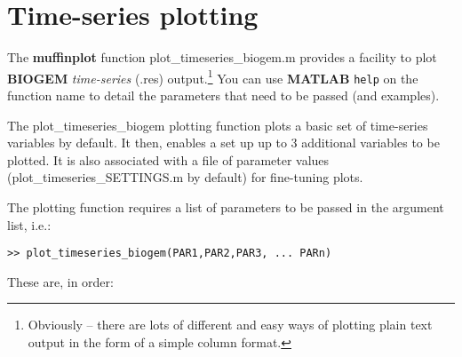 \documentclass[11pt,fleqn]{book} %
\begin{document}

\section{Time-series plotting}

The \textbf{muffinplot} function \textsf{\footnotesize plot\_timeseries\_biogem.m} provides a facility to plot \textbf{BIOGEM} \textit{time-series} (\textsf{\small .res}) output.\footnote{Obviously -- there are lots of different and easy ways of plotting plain text output in the form of a simple column format.} You can use \textbf{MATLAB} \texttt{help} on the function name to detail the parameters that need to be passed (and examples).

The \textsf{\footnotesize plot\_timeseries\_biogem} plotting function plots a basic set of time-series variables by default. It then, enables a set up up to 3 additional variables to be plotted. It is also associated with a file of parameter values (\textsf{\footnotesize plot\_timeseries\_SETTINGS.m} by default) for fine-tuning plots.

The plotting function requires a list of parameters to be passed in the argument list, i.e.:
\begin{verbatim}
>> plot_timeseries_biogem(PAR1,PAR2,PAR3, ... PARn)
\end{verbatim}

These are, in order:
\end{document}
